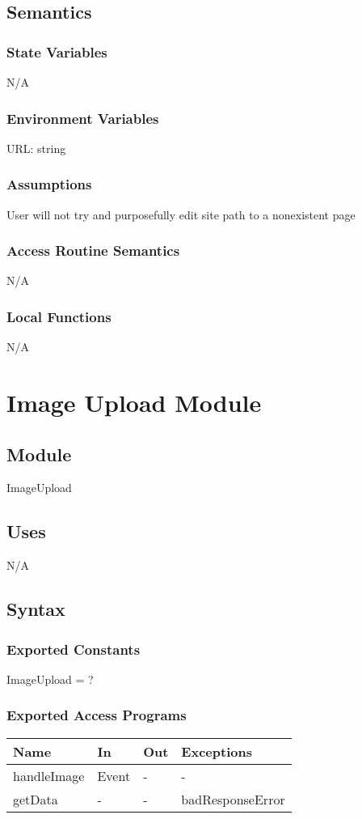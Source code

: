 \documentclass[12pt, titlepage]{article}
\begin{document}
\subsection{Semantics}
\subsubsection{State Variables}
N/A
\subsubsection{Environment Variables}
URL: string
\subsubsection{Assumptions}
User will not try and purposefully edit site path to a nonexistent page
\subsubsection{Access Routine Semantics}
N/A
\subsubsection{Local Functions}
N/A
\newpage
\section{Image Upload Module} \label{ImageUpload} 
\subsection{Module}
ImageUpload
\subsection{Uses}
N/A
\subsection{Syntax}
\subsubsection{Exported Constants}
ImageUpload = ?
\subsubsection{Exported Access Programs}
\begin{center}
\begin{tabular}{p{2cm} p{4cm} p{4cm} p{2cm}}
		
	\hline
	\textbf{Name} & \textbf{In} & \textbf{Out} & \textbf{Exceptions} \\
	\hline
	handleImage & Event & - & - \\
	getData & - & - & badResponseError \\
	\hline
\end{tabular}
\end{center}
\end{document}
